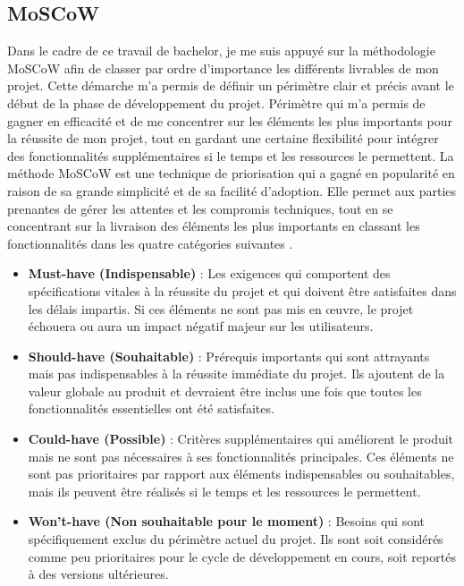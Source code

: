 \documentclass[12pt]{article}
\begin{document}
\subsection{MoSCoW}
Dans le cadre de ce travail de bachelor, je me suis appuyé sur la méthodologie MoSCoW afin de classer par ordre d'importance les différents livrables de mon projet. Cette démarche m'a permis de définir un périmètre clair et précis avant le début de la phase de développement du projet. Périmètre qui m'a permis de gagner en efficacité et de me concentrer sur les éléments les plus importants pour la réussite de mon projet, tout en gardant une certaine flexibilité pour intégrer des fonctionnalités supplémentaires si le temps et les ressources le permettent.
\newline\newline
La méthode MoSCoW est une technique de priorisation qui a gagné en popularité en raison de sa grande simplicité et de sa facilité d'adoption. Elle permet aux parties prenantes de gérer les attentes et les compromis techniques, tout en se concentrant sur la livraison des éléments les plus importants en classant les fonctionnalités dans les quatre catégories suivantes \parencite[trad. de][pp.~2-3]{vijayakumar_assessing_2024}.
\newline\newline
\begin{itemize}
    \item \textbf{Must-have (Indispensable)} : Les exigences qui comportent des spécifications vitales à la réussite du projet et qui doivent être satisfaites dans les délais impartis. Si ces éléments ne sont pas mis en œuvre, le projet échouera ou aura un impact négatif majeur sur les utilisateurs.
    \item \textbf{Should-have (Souhaitable)} : Prérequis importants qui sont attrayants mais pas indispensables à la réussite immédiate du projet. Ils ajoutent de la valeur globale au produit et devraient être inclus une fois que toutes les fonctionnalités essentielles ont été satisfaites.
    \item \textbf{Could-have (Possible)} : Critères supplémentaires qui améliorent le produit mais ne sont pas nécessaires à ses fonctionnalités principales. Ces éléments ne sont pas prioritaires par rapport aux éléments indispensables ou souhaitables, mais ils peuvent être réalisés si le temps et les ressources le permettent.
    \item \textbf{Won't-have (Non souhaitable pour le moment)} : Besoins qui sont spécifiquement exclus du périmètre actuel du projet. Ils sont soit considérés comme peu prioritaires pour le cycle de développement en cours, soit reportés à des versions ultérieures.
\end{itemize}\
\newline
\end{document}
